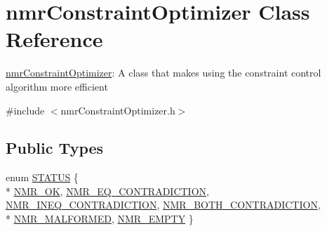 \hypertarget{classnmr_constraint_optimizer}{}\section{nmr\+Constraint\+Optimizer Class Reference}
\label{classnmr_constraint_optimizer}


\hyperlink{classnmr_constraint_optimizer}{nmr\+Constraint\+Optimizer}\+: A class that makes using the constraint control algorithm more efficient  




{\ttfamily \#include $<$nmr\+Constraint\+Optimizer.\+h$>$}

\subsection*{Public Types}
\begin{DoxyCompactItemize}
\item 
enum \hyperlink{classnmr_constraint_optimizer_ad46bf972892431d2c0a43a7099aec898}{S\+T\+A\+T\+U\+S} \{ \\*
\hyperlink{classnmr_constraint_optimizer_ad46bf972892431d2c0a43a7099aec898a03c26b81bdd26e621235c27816b489e9}{N\+M\+R\+\_\+\+O\+K}, 
\hyperlink{classnmr_constraint_optimizer_ad46bf972892431d2c0a43a7099aec898a24fba63a9b2e2a09a3cef637540da858}{N\+M\+R\+\_\+\+E\+Q\+\_\+\+C\+O\+N\+T\+R\+A\+D\+I\+C\+T\+I\+O\+N}, 
\hyperlink{classnmr_constraint_optimizer_ad46bf972892431d2c0a43a7099aec898a176272c7f4ac3938200f4d8009ed7c4d}{N\+M\+R\+\_\+\+I\+N\+E\+Q\+\_\+\+C\+O\+N\+T\+R\+A\+D\+I\+C\+T\+I\+O\+N}, 
\hyperlink{classnmr_constraint_optimizer_ad46bf972892431d2c0a43a7099aec898aa25395952bb1907f0f8911e4d197c04b}{N\+M\+R\+\_\+\+B\+O\+T\+H\+\_\+\+C\+O\+N\+T\+R\+A\+D\+I\+C\+T\+I\+O\+N}, 
\\*
\hyperlink{classnmr_constraint_optimizer_ad46bf972892431d2c0a43a7099aec898a7acddef3617730d0cb7579dea353593e}{N\+M\+R\+\_\+\+M\+A\+L\+F\+O\+R\+M\+E\+D}, 
\hyperlink{classnmr_constraint_optimizer_ad46bf972892431d2c0a43a7099aec898a74e422b788be448ad7fcdbc1f19234b7}{N\+M\+R\+\_\+\+E\+M\+P\+T\+Y}
 \}
\end{DoxyCompactItemize}
